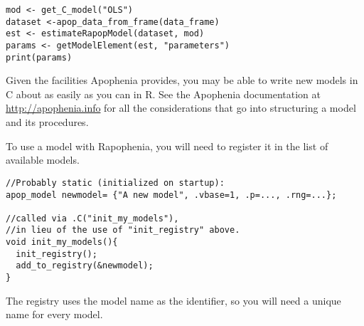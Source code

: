 \documentclass{article}
\begin{document}
\begin{verbatim}
mod <- get_C_model("OLS")
dataset <-apop_data_from_frame(data_frame)
est <- estimateRapopModel(dataset, mod)
params <- getModelElement(est, "parameters")
print(params)
\end{verbatim}

Given the facilities Apophenia provides, you may be able to write new models in C about
as easily as you can in R. See the Apophenia documentation at \url{http://apophenia.info}
for all the considerations that go into structuring a model and its procedures. 

To use a model with Rapophenia, you will need to register it in the list of available
models.

\begin{verbatim}
//Probably static (initialized on startup):
apop_model newmodel= {"A new model", .vbase=1, .p=..., .rng=...};

//called via .C("init_my_models"), 
//in lieu of the use of "init_registry" above.
void init_my_models(){
  init_registry();
  add_to_registry(&newmodel);
}
\end{verbatim}

The registry uses the model name as the identifier, so you will need a unique name for
every model.
\end{document}
